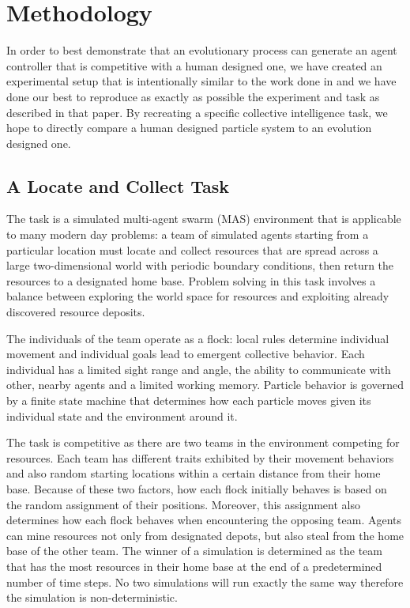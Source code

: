\documentclass[conference,final]{IEEEtran}
\begin{document}
\section{Methodology}

In order to best demonstrate that an evolutionary process can generate an agent controller that is competitive with a human designed one, we have created an experimental setup that is intentionally similar to the work done in \cite{rodriguez2004extending} and we have done our best to reproduce as exactly as possible the experiment and task as described in that paper. By recreating a specific collective intelligence task, we hope to directly compare a human designed particle system to an evolution designed one. 

\subsection{A Locate and Collect Task}

The task is a simulated multi-agent swarm (MAS) environment that is applicable to many modern day problems: a team of simulated agents starting from a particular location must locate and collect resources that are spread across a large two-dimensional world with periodic boundary conditions, then return the resources to a designated home base. Problem solving in this task involves a balance between exploring the world space for resources and exploiting already discovered resource deposits.

The individuals of the team operate as a flock: local rules determine individual movement and individual goals lead to emergent collective behavior. Each individual has a limited sight range and angle, the ability to communicate with other, nearby agents and a limited working memory. Particle behavior is governed by a finite state machine that determines how each particle moves given its individual state and the environment around it.

The task is competitive as there are two teams in the environment competing for resources. Each team has different traits exhibited by their movement behaviors and also random starting locations within a certain distance from their home base. Because of these two factors, how each flock initially behaves is based on the random assignment of their positions. Moreover, this assignment also determines how each flock behaves when encountering the opposing team. Agents can mine resources not only from designated depots, but also steal from the home base of the other team. The winner of a simulation is determined as the team that has the most resources in their home base at the end of a predetermined number of time steps. No two simulations will run exactly the same way therefore the simulation is non-deterministic.
\end{document}

